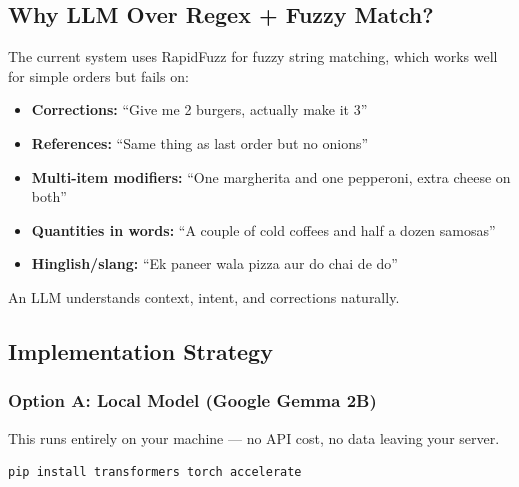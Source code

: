 \documentclass[12pt, a4paper]{article}
\begin{document}
\subsection{Why LLM Over Regex + Fuzzy Match?}

The current system uses RapidFuzz for fuzzy string matching, which works well for simple orders but fails on:

\begin{itemize}[nosep]
    \item \textbf{Corrections:} ``Give me 2 burgers, actually make it 3''
    \item \textbf{References:} ``Same thing as last order but no onions''
    \item \textbf{Multi-item modifiers:} ``One margherita and one pepperoni, extra cheese on both''
    \item \textbf{Quantities in words:} ``A couple of cold coffees and half a dozen samosas''
    \item \textbf{Hinglish/slang:} ``Ek paneer wala pizza aur do chai de do''
\end{itemize}

An LLM understands context, intent, and corrections naturally.


\subsection{Implementation Strategy}

\subsubsection{Option A: Local Model (Google Gemma 2B)}

This runs entirely on your machine --- no API cost, no data leaving your server.

\begin{lstlisting}[language=bash]
pip install transformers torch accelerate
\end{lstlisting}
\end{document}
